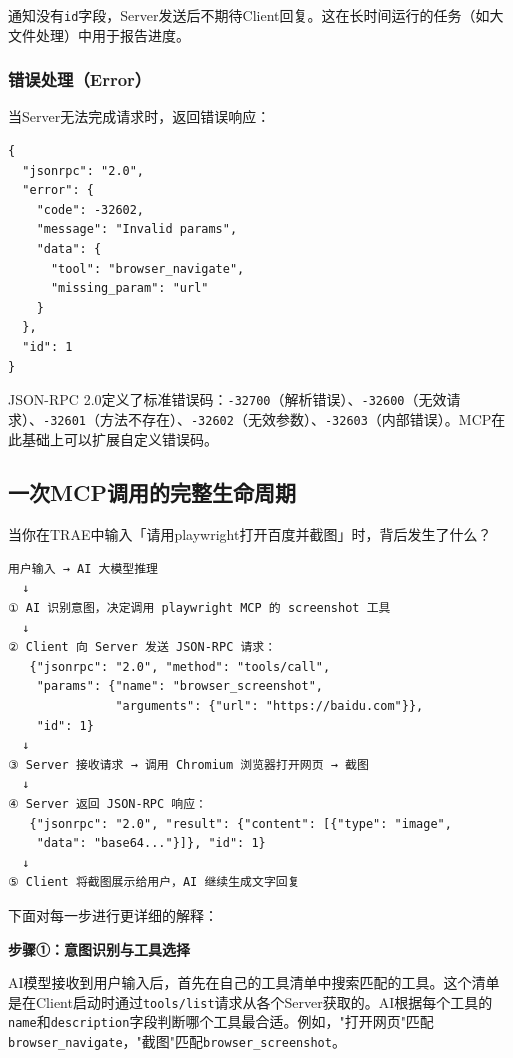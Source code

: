 通知没有\texttt{id}字段，Server发送后不期待Client回复。这在长时间运行的任务（如大文件处理）中用于报告进度。

\subsubsection{错误处理（Error）}

当Server无法完成请求时，返回错误响应：

\begin{lstlisting}[style=json]
{
  "jsonrpc": "2.0",
  "error": {
    "code": -32602,
    "message": "Invalid params",
    "data": {
      "tool": "browser_navigate",
      "missing_param": "url"
    }
  },
  "id": 1
}
\end{lstlisting}

JSON-RPC 2.0定义了标准错误码：\texttt{-32700}（解析错误）、\texttt{-32600}（无效请求）、\texttt{-32601}（方法不存在）、\texttt{-32602}（无效参数）、\texttt{-32603}（内部错误）。MCP在此基础上可以扩展自定义错误码。

\subsection{一次MCP调用的完整生命周期}

当你在TRAE中输入「请用playwright打开百度并截图」时，背后发生了什么？

\begin{verbatim}
用户输入 → AI 大模型推理
  ↓
① AI 识别意图，决定调用 playwright MCP 的 screenshot 工具
  ↓
② Client 向 Server 发送 JSON-RPC 请求：
   {"jsonrpc": "2.0", "method": "tools/call",
    "params": {"name": "browser_screenshot",
               "arguments": {"url": "https://baidu.com"}},
    "id": 1}
  ↓
③ Server 接收请求 → 调用 Chromium 浏览器打开网页 → 截图
  ↓
④ Server 返回 JSON-RPC 响应：
   {"jsonrpc": "2.0", "result": {"content": [{"type": "image",
    "data": "base64..."}]}, "id": 1}
  ↓
⑤ Client 将截图展示给用户，AI 继续生成文字回复
\end{verbatim}

下面对每一步进行更详细的解释：

\textbf{步骤①：意图识别与工具选择}

AI模型接收到用户输入后，首先在自己的工具清单中搜索匹配的工具。这个清单是在Client启动时通过\texttt{tools/list}请求从各个Server获取的。AI根据每个工具的\texttt{name}和\texttt{description}字段判断哪个工具最合适。例如，"打开网页"匹配\texttt{browser\_navigate}，"截图"匹配\texttt{browser\_screenshot}。


